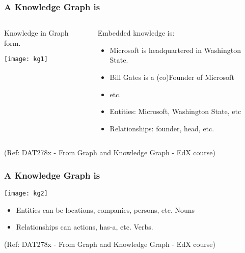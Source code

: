 \begin{frame}\frametitle{A Knowledge Graph is}


\begin{columns}
    \begin{column}[T]{0.6\linewidth}

		Knowledge in Graph form.

			\begin{center}
			\texttt{[image: kg1]}
			\end{center}	
    \end{column}
    \begin{column}[T]{0.4\linewidth}
			Embedded knowledge is:
			\begin{itemize}
			\item Microsoft is headquartered in Washington State.
			\item Bill Gates is a (co)Founder of Microsoft
			\item etc.
			\item Entities: Microsoft, Washington State, etc
			\item Relationships: founder, head, etc.
			\end{itemize}
    \end{column}
  \end{columns}
	

  

{\tiny (Ref: DAT278x - From Graph and Knowledge Graph - EdX course)}
\end{frame}


\begin{frame}\frametitle{A Knowledge Graph is}

\begin{center}
\texttt{[image: kg2]}
\end{center}	

\begin{itemize}
\item Entities can be locations, companies, persons, etc. Nouns
\item Relationships can actions, has-a, etc. Verbs.
\end{itemize}


{\tiny (Ref: DAT278x - From Graph and Knowledge Graph - EdX course)}
\end{frame}

